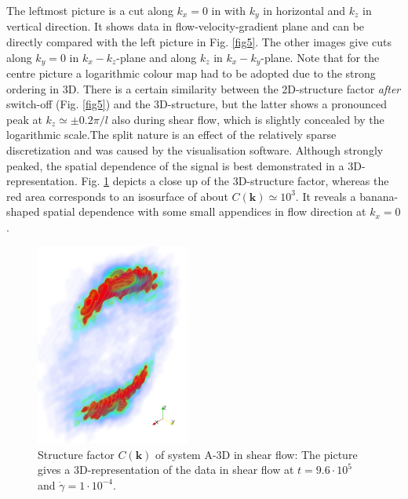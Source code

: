 \documentclass[8.5pt,twoside,twocolumn]{article}
\newcommand{\e}[1]{\cdot10^{#1}}
\begin{document}
The leftmost picture is a cut along $k_x=0$ in with $k_y$ in horizontal and $k_z$ in vertical direction.
It shows data in flow-velocity-gradient plane and can be directly compared with the left picture in Fig. \ref{fig5}.
The other images give cuts along $k_y=0$ in $k_x-k_z$-plane and along $k_z$ in $k_x-k_y$-plane. 
Note that for the centre picture a logarithmic colour map had to be adopted due to the strong ordering in 3D.
There is a certain similarity between the 2D-structure factor {\it after} switch-off (Fig. \ref{fig5}) and the 3D-structure, but the latter shows a pronounced peak at $k_z\simeq\pm0.2\pi/l$ also during shear flow, which is slightly concealed by the logarithmic scale.The split nature is an effect of the relatively sparse discretization and was caused by the visualisation software.
Although strongly peaked, the spatial dependence of the signal is best demonstrated in a 3D-representation. 
Fig. \ref{fig15} depicts a close up of the 3D-structure factor, whereas the red area corresponds to an isosurface of about $C({\bm k})\simeq 10^3$.
It reveals a banana-shaped spatial dependence with some small appendices in flow direction at $k_x=0$.

\begin{figure}[htp!]
\centering
\includegraphics[angle=0,width=0.45\textwidth]{ck_run788_960_zoom.jpg}
\caption{Structure factor $C({\mathbf k})$ of system A-3D in shear flow: The picture gives a 3D-representation of the data in shear flow at $t=9.6\e{5}$ and $\dot{\gamma}=1\cdot10^{-4}$.}
\label{fig15}
\end{figure}
\end{document}
